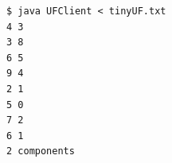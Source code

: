 \documentclass[8pt,a4paper,compress]{beamer}
\begin{document}
\begin{frame}[fragile]
\begin{minipage}{250pt}
\begin{lstlisting}[language={},style=focusin]
$ java UFClient < tinyUF.txt 
4 3
3 8
6 5
9 4
2 1
5 0
7 2
6 1
2 components
\end{lstlisting}
\end{minipage}%
\begin{minipage}{60pt}
\hfill {}
\end{minipage}
\end{frame}
\end{document}
